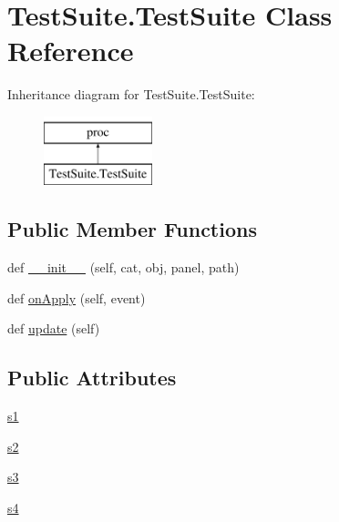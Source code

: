 \hypertarget{classTestSuite_1_1TestSuite}{}\section{Test\+Suite.\+Test\+Suite Class Reference}
\label{classTestSuite_1_1TestSuite}
Inheritance diagram for Test\+Suite.\+Test\+Suite\+:\begin{figure}[H]
\begin{center}
\leavevmode
\includegraphics[height=2.000000cm]{classTestSuite_1_1TestSuite}
\end{center}
\end{figure}
\subsection*{Public Member Functions}
\begin{DoxyCompactItemize}
\item 
def \hyperlink{classTestSuite_1_1TestSuite_a21be2485fa1e8a4d16b7f0a90b186599}{\+\_\+\+\_\+init\+\_\+\+\_\+} (self, cat, obj, panel, path)
\item 
def \hyperlink{classTestSuite_1_1TestSuite_a40cdae2e901d21c94a0153699f518846}{on\+Apply} (self, event)
\item 
def \hyperlink{classTestSuite_1_1TestSuite_aee5f1c66f7aa5189cd2ed3cf2fca93f5}{update} (self)
\end{DoxyCompactItemize}
\subsection*{Public Attributes}
\begin{DoxyCompactItemize}
\item 
\hyperlink{classTestSuite_1_1TestSuite_a314e3935627e2cd3c18e13746a9758fd}{s1}
\item 
\hyperlink{classTestSuite_1_1TestSuite_a30791bbda8dc9662453603b1be89281a}{s2}
\item 
\hyperlink{classTestSuite_1_1TestSuite_a9995e2f1a3b89fdf26e782b9aefae2cc}{s3}
\item 
\hyperlink{classTestSuite_1_1TestSuite_a8bd2aac24a75e71c7da35673d95f481a}{s4}
\end{DoxyCompactItemize}


